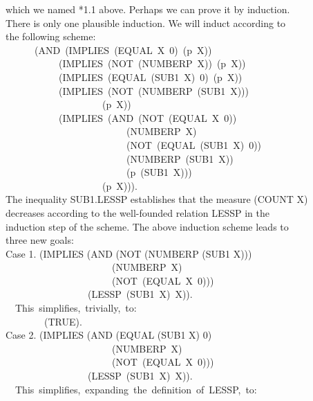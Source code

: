 \documentclass[10pt]{book}
\newenvironment{pubasis}{\begin{flushleft}}{\end{flushleft}}
\begin{document}
\begin{pubasis}
which we named *1.1 above.  Perhaps we can prove it by induction.\\
There is only one plausible induction.  We will induct according to\\
the following scheme:\\
~~~~~~(AND~(IMPLIES~(EQUAL~X~0)~(p~X))\\
~~~~~~~~~~~(IMPLIES~(NOT~(NUMBERP~X))~(p~X))\\
~~~~~~~~~~~(IMPLIES~(EQUAL~(SUB1~X)~0)~(p~X))\\
~~~~~~~~~~~(IMPLIES~(NOT~(NUMBERP~(SUB1~X)))\\
~~~~~~~~~~~~~~~~~~~~(p~X))\\
~~~~~~~~~~~(IMPLIES~(AND~(NOT~(EQUAL~X~0))\\
~~~~~~~~~~~~~~~~~~~~~~~~~(NUMBERP~X)\\
~~~~~~~~~~~~~~~~~~~~~~~~~(NOT~(EQUAL~(SUB1~X)~0))\\
~~~~~~~~~~~~~~~~~~~~~~~~~(NUMBERP~(SUB1~X))\\
~~~~~~~~~~~~~~~~~~~~~~~~~(p~(SUB1~X)))\\
~~~~~~~~~~~~~~~~~~~~(p~X))).\\
The inequality SUB1.LESSP establishes that the measure (COUNT X)\\
decreases according to the well-founded relation LESSP in the\\
induction step of the scheme.  The above induction scheme leads to\\
three new goals:\\

Case 1.	(IMPLIES (AND (NOT (NUMBERP (SUB1 X)))\\
~~~~~~~~~~~~~~~~~~~~~~(NUMBERP~X)\\
~~~~~~~~~~~~~~~~~~~~~~(NOT~(EQUAL~X~0)))\\
~~~~~~~~~~~~~~~~~(LESSP~(SUB1~X)~X)).\\

~~This~simplifies,~trivially,~to:\\

~~~~~~~~(TRUE).\\

Case 2.	(IMPLIES (AND (EQUAL (SUB1 X) 0)\\
~~~~~~~~~~~~~~~~~~~~~~(NUMBERP~X)\\
~~~~~~~~~~~~~~~~~~~~~~(NOT~(EQUAL~X~0)))\\
~~~~~~~~~~~~~~~~~(LESSP~(SUB1~X)~X)).\\

~~This~simplifies,~expanding~the~definition~of~LESSP,~to:\\


\end{pubasis}
\end{document}
